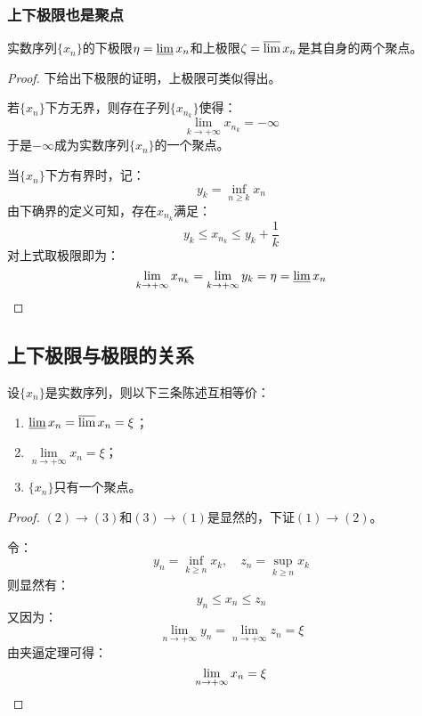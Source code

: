 \subsubsection{上下极限也是聚点}
\begin{theorem}
	实数序列$\{x_n\}$的下极限$\eta=\varliminf x_n$和上极限$\zeta=\varlimsup x_n$是其自身的两个聚点。
\end{theorem}
\begin{proof}
	下给出下极限的证明，上极限可类似得出。\par
	若$\{x_n\}$下方无界，则存在子列$\{x_{n_k}\}$使得：
	\begin{equation*}
		\lim_{k\to+\infty}x_{n_k}=-\infty
	\end{equation*}
	于是$-\infty$成为实数序列$\{x_n\}$的一个聚点。\par
	当$\{x_n\}$下方有界时，记：
	\begin{equation*}
		y_k=\inf_{n\geqslant k}x_n
	\end{equation*}
	由下确界的定义可知，存在$x_{n_k}$满足：
	\begin{equation*}
		y_k\leqslant x_{n_k}\leqslant y_k+\frac{1}{k}
	\end{equation*}
	对上式取极限即为：
	\begin{equation*}
		\lim_{k\to+\infty}x_{n_k}=\lim_{k\to+\infty}y_k=\eta=\varliminf x_n \qedhere
	\end{equation*}	
\end{proof}

\subsection{上下极限与极限的关系}
\begin{theorem}
	设$\{x_n\}$是实数序列，则以下三条陈述互相等价：
	\begin{enumerate}
		\item $\varliminf x_n=\varlimsup x_n=\xi$；
		\item $\lim\limits_{n\to+\infty}x_n=\xi$；
		\item $\{x_n\}$只有一个聚点。
	\end{enumerate}
\end{theorem}
\begin{proof}
	$(2)\rightarrow(3)$和$(3)\rightarrow(1)$是显然的，下证$(1)\rightarrow(2)$。\par
	令：
	\begin{equation*}
		y_n=\inf_{k\geqslant n}x_k,\quad
		z_n=\sup_{k\geqslant n}x_k
	\end{equation*}
	则显然有：
	\begin{equation*}
		y_n\leqslant x_n\leqslant z_n
	\end{equation*}
	又因为：
	\begin{equation*}
		\lim_{n\to+\infty}y_n=\lim_{n\to+\infty}z_n=\xi
	\end{equation*}
	由夹逼定理可得：
	\begin{equation*}
		\lim_{n\to+\infty}x_n=\xi\qedhere
	\end{equation*}
\end{proof}

